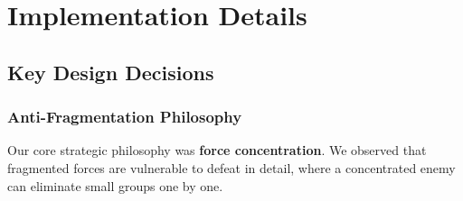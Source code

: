\documentclass[11pt,a4paper]{article}
\begin{document}
\section{Implementation Details}

\subsection{Key Design Decisions}

\subsubsection{Anti-Fragmentation Philosophy}

Our core strategic philosophy was \textbf{force concentration}. We observed that fragmented forces are vulnerable to defeat in detail, where a concentrated enemy can eliminate small groups one by one.
\end{document}
